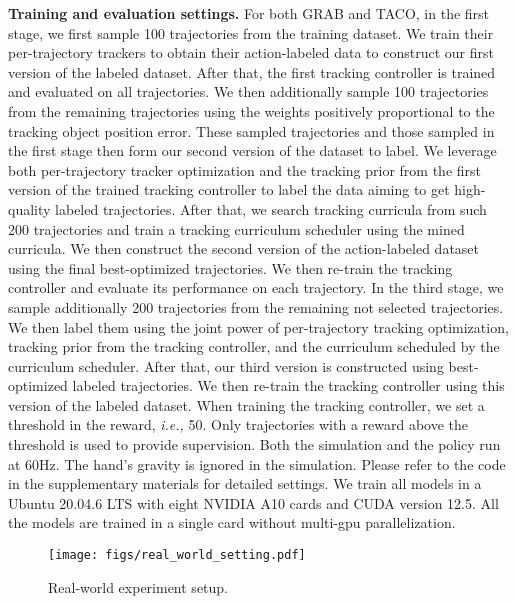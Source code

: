 \noindent\textbf{Training and evaluation settings.} 
For both GRAB and TACO, in the first stage, we first sample 100 trajectories from the training dataset. We train their per-trajectory trackers to obtain their action-labeled data to construct our first version of the labeled dataset. After that, the first tracking controller is trained and evaluated on all trajectories. We then additionally sample 100 trajectories from the remaining trajectories using the weights positively proportional to the tracking object position error. These sampled trajectories and those sampled in the first stage then form our second version of the dataset to label. We leverage both per-trajectory tracker optimization and the tracking prior from the first version of the trained tracking controller to label the data aiming to get high-quality labeled trajectories. After that, we search tracking curricula from such 200 trajectories and train a tracking curriculum scheduler using the mined curricula. We then construct the second version of the action-labeled dataset using the final best-optimized trajectories. We then re-train the tracking controller and evaluate its performance on each trajectory. In the third stage, we sample additionally 200 trajectories from the remaining not selected trajectories. We then label them using the joint power of per-trajectory tracking optimization, tracking prior from the tracking controller, and the curriculum scheduled by the curriculum scheduler. After that, our third version is constructed using best-optimized labeled trajectories. We then re-train the tracking controller using this version of the labeled dataset. When training the tracking controller, we set a threshold in the reward, \emph{i.e.,} 50. Only trajectories with a reward above the threshold is used to provide supervision. 
Both the simulation and the policy run at 60Hz. The hand's gravity is ignored in the simulation. 
Please refer to the code in the supplementary materials for detailed settings. 
We train all models in a Ubuntu 20.04.6 LTS with eight NVIDIA A10 cards and CUDA version 12.5. All the models are trained in a single card without multi-gpu parallelization. 


\begin{figure}[h]
  \centering
  \texttt{[image: figs/real\_world\_setting.pdf]}
  \caption{
  Real-world experiment setup.
  }
  \label{fig_real_world_setup}
\end{figure}

